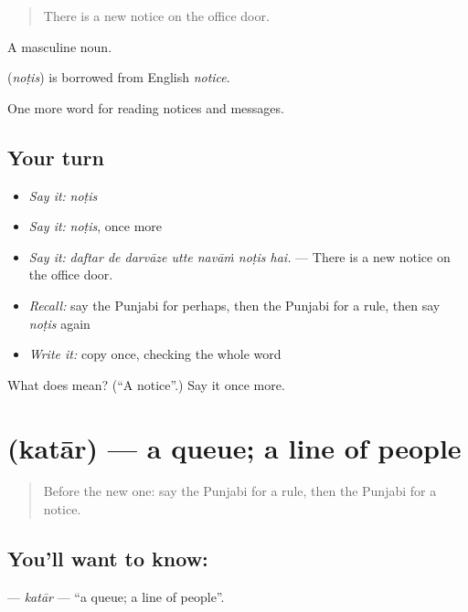 \begin{quote}
There is a new notice on the office door.
\end{quote}

A masculine noun.

\begin{cousinweb}
\textbf{} (\emph{noṭis}) is borrowed from English \emph{notice}.
\end{cousinweb}

\begin{grammarlens}[title={What you've built}]
One more word for reading notices and messages.
\end{grammarlens}

\subsection*{Your turn}
\begin{itemize}
\raggedright
  \item \emph{Say it:} \emph{noṭis}
  \item \emph{Say it:} \emph{noṭis}, once more
  \item \emph{Say it:} \emph{daftar de darvāze utte navāṁ noṭis hai.} — There is a new notice on the office door.
  \item \emph{Recall:} say the Punjabi for perhaps, then the Punjabi for a rule, then say \emph{noṭis} again
  \item \emph{Write it:} copy \textbf{} once, checking the whole word
\end{itemize}

\begin{tcolorbox}[breakable,colback=teal!4,colframe=teal!35!black,title={Before you move on}]
What does  mean? (\textquotedblleft{}A notice\textquotedblright{}.) Say it once more.
\end{tcolorbox}
\section[\texorpdfstring{\pa{ਕਤਾਰ} (katār)}{ਕਤਾਰ (katār)}]{ (katār) — a queue; a line of people}

\label{lesson:PA-C253-katar}



\begin{quote}
Before the new one: say the Punjabi for a rule, then the Punjabi for a notice.
\end{quote}

\subsection*{You'll want to know: }
\textbf{} — \emph{katār} — \textquotedblleft{}a queue; a line of people\textquotedblright{}.

